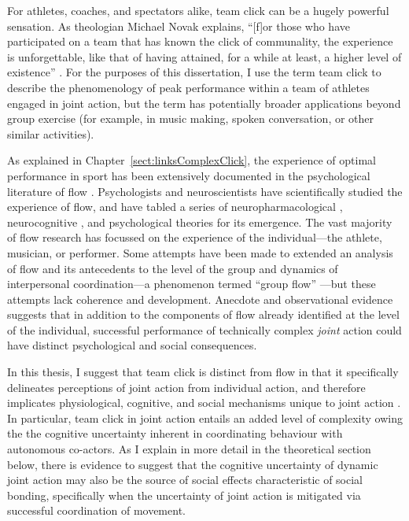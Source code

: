 \begin{CJK}{UTF8}{gbsn}

For athletes, coaches, and spectators alike, team click can be a hugely powerful sensation.  As theologian Michael Novak explains, ``[f]or those who have participated on a team that has known the click of communality, the experience is unforgettable, like that of having attained, for a while at least, a higher level of existence'' \citep[11]{White2011}. For the purposes of this dissertation, I use the term team click to describe the phenomenology of peak performance within a team of athletes engaged in joint action, but the term has potentially broader applications beyond group exercise (for example, in music making, spoken conversation, or other similar activities).

As explained in Chapter~\ref{sect:linksComplexClick}, the experience of optimal performance in sport has been extensively documented in the psychological literature of flow \citep{Csikszentmihalyi1992,Jackson1995,Jackson1999,McNeill1995}.  Psychologists and neuroscientists have scientifically studied the experience of flow, and have tabled a series of neuropharmacological \citep{Boecker2008}, neurocognitive \citep{Dietrich2006,Dietrich2011,Labelle2013}, and psychological \citep{Csikszentmihalyi1992} theories for its emergence.  The vast majority of flow research has focussed on the experience of the individual---the athlete, musician, or performer.  Some attempts have been made to extended an analysis of flow and its antecedents to the level of the group and dynamics of interpersonal coordination---a phenomenon termed ``group flow'' \citep{Sawyer2006}---but these attempts lack coherence and development.  Anecdote and observational evidence suggests that in addition to the components of flow already identified at the level of the individual, successful performance of technically complex
\textit{joint} action could have distinct psychological and social consequences.

In this thesis, I suggest that team click is distinct from flow in that it specifically delineates perceptions of joint action from individual action, and therefore implicates physiological, cognitive, and social mechanisms unique to joint action \citep{Vesper2010}.  In particular, team click in joint action entails an added level of complexity owing the the cognitive uncertainty inherent in coordinating behaviour with autonomous co-actors.  As I explain in more detail in the theoretical section below, there is evidence to suggest that the cognitive uncertainty of dynamic joint action may also be the source of social effects characteristic of social bonding, specifically when the uncertainty of joint action is mitigated via successful coordination of movement.


\end{CJK}
